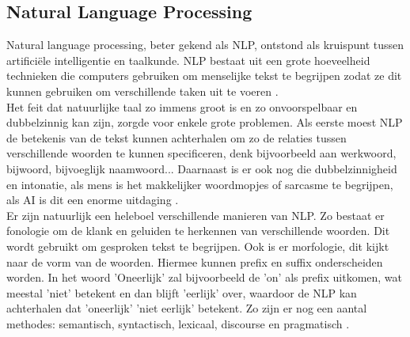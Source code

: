 \subsection{Natural Language Processing}
Natural language processing, beter gekend als NLP, ontstond als kruispunt tussen artificiële intelligentie en taalkunde. NLP bestaat uit een grote hoeveelheid technieken die computers gebruiken om menselijke tekst te begrijpen zodat ze dit kunnen gebruiken om verschillende taken uit te voeren \autocite{Nadkarni2011}.
\\\indent
Het feit dat natuurlijke taal zo immens groot is en zo onvoorspelbaar en dubbelzinnig kan zijn, zorgde voor enkele grote problemen. Als eerste moest NLP de betekenis van de tekst kunnen achterhalen om zo de relaties tussen verschillende woorden te kunnen specificeren, denk bijvoorbeeld aan werkwoord, bijwoord, bijvoeglijk naamwoord... Daarnaast is er ook nog die dubbelzinnigheid en intonatie, als mens is het makkelijker woordmopjes of sarcasme te begrijpen, als AI is dit een enorme uitdaging \autocite{Nadkarni2011}.
\\\indent
Er zijn natuurlijk een heleboel verschillende manieren van NLP. Zo bestaat er fonologie om de klank en geluiden te herkennen van verschillende woorden. Dit wordt gebruikt om gesproken tekst te begrijpen. Ook is er morfologie, dit kijkt naar de vorm van de woorden. Hiermee kunnen prefix en suffix onderscheiden worden. In het woord 'Oneerlijk' zal bijvoorbeeld de 'on' als prefix uitkomen, wat meestal 'niet' betekent en dan blijft 'eerlijk' over, waardoor de NLP kan achterhalen dat 'oneerlijk' 'niet eerlijk' betekent. Zo zijn er nog een aantal methodes: semantisch, syntactisch, lexicaal, discourse en pragmatisch \autocite{Liddy2001}.



